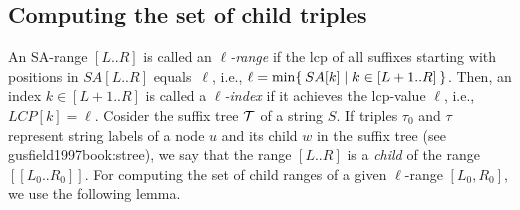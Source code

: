 
\subsection{Computing the set of child triples}
\label{sec:algo:branch}
An SA-range $[L..R]$ is called an \textit{$\ell$-range} if the lcp of all suffixes starting  with positions in $SA[L..R]$ equals~$\ell$, i.e.,
$\ell = \min\{\kern0.2em SA[k] \mid k \in [L+1..R] \kern0.2em\}$. 
Then, an index $k \in [L+1..R]$ is called a \textit{$\ell$-index} if it achieves the lcp-value $\ell$, i.e., $LCP[k] = \ell$.
Cosider the suffix tree $\mathcal{T}$ of a string $S$.
If triples $\tau_0$ and $\tau$ represent string labels of a node $u$ and its child $w$ in the suffix tree (see gusfield1997book:stree), we say that the range $[L..R]$ is a \textit{child} of the range $[[L_0..R_0]]$. 
For computing the set of child ranges of a given $\ell$-range $[L_0, R_0]$, we use the following lemma.

